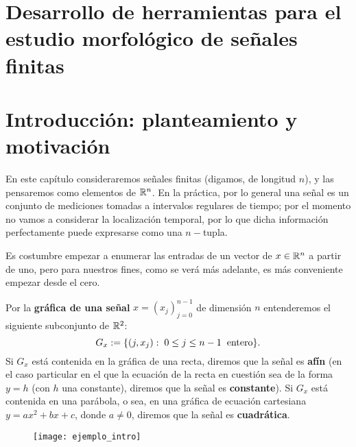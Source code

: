 \section{Desarrollo de herramientas para el estudio morfológico de señales finitas}
\section{Introducción: planteamiento y motivación}

En este capítulo consideraremos señales
finitas
(digamos, de
longitud $n$), y las pensaremos como elementos de $\mathbb{R}^{n}$.
En la práctica, por lo general
una señal es un conjunto de mediciones tomadas
a intervalos regulares de tiempo; por el momento no vamos
a considerar la localización temporal, por lo que dicha
información perfectamente puede expresarse como 
una $n-$tupla.

Es costumbre empezar
a enumerar las entradas de un vector
de $x \in \mathbb{R}^{n}$ a partir de uno, pero
para nuestros fines,
como se verá más adelante, es más 
conveniente empezar desde el cero.

\begin{defi}
Por la \textbf{gráfica de una señal} $x=(x_{j})_{j=0}^{n-1}$
de dimensión $n$ entenderemos
 el siguiente subconjunto de $\mathbb{R}^{2}$:
\[
G_{x} := 
\{ (j, x_{j} ) : \hspace{0.1cm} 0 \leq j \leq n-1
\hspace{0.2cm} \text{entero}\} .
\]
Si $G_{x}$ está contenida en la gráfica de una recta, diremos que la
señal es \textbf{afín} (en el caso particular en el que
la ecuación de la recta en cuestión sea de la forma $y= h$
(con $h$ una constante),
diremos que la señal es
\textbf{constante}). Si  $G_{x}$ está contenida en 
una parábola, o sea, en una
gráfica de ecuación cartesiana
$y=ax^{2}+ bx +c$, donde $a \neq 0$, diremos 
que la señal es \textbf{cuadrática}.
\end{defi}





\begin{figure}[H]
	\texttt{[image: ejemplo\_intro]} 
 \end{figure}


